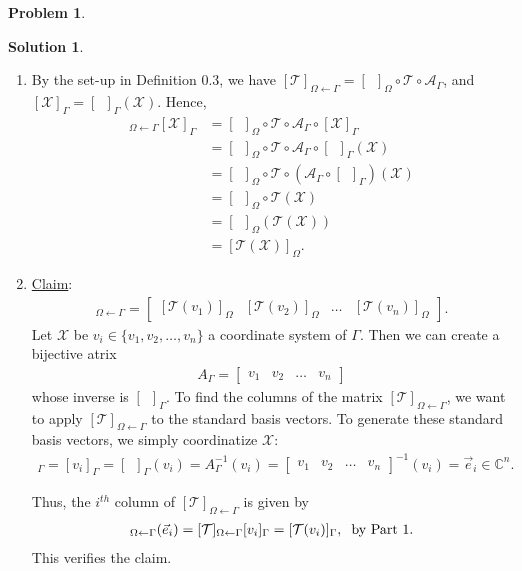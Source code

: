 \documentclass{book}
\theoremstyle{definition}
\newtheorem*{prob*}{Problem}
\newtheorem*{sln*}{Solution}
\newcommand{\T}{\mathcal{T}}
\begin{document}
\begin{prob*}
\begin{sln*}
\begin{enumerate}
			
			\item By the set-up in Definition 0.3, we have $[\T]_{\Omega\leftarrow \Gamma} = [\,\,\,]_\Omega\circ\T\circ \mathcal{A}_\Gamma$, and $[\mathcal{X}]_\Gamma = [\,\,\,]_\Gamma(\mathcal{X})$. Hence,
			\begin{align*}
			[\T]_{\Omega\leftarrow \Gamma}[\mathcal{X}]_\Gamma 
			&= [\,\,\,]_\Omega\circ\T\circ \mathcal{A}_\Gamma \circ [\mathcal{X}]_\Gamma \\
			&= [\,\,\,]_\Omega\circ\T\circ \mathcal{A}_\Gamma \circ [\,\,\,]_\Gamma(\mathcal{X})\\
			&= [\,\,\,]_\Omega\circ\T\circ \left(\mathcal{A}_\Gamma \circ [\,\,\,]_\Gamma\right)(\mathcal{X})\\
			&= [\,\,\,]_\Omega\circ\T(\mathcal{X})\\
			&= [\,\,\,]_\Omega\left(\T(\mathcal{X})\right)\\
			&= [\mathcal{T}(\mathcal{X})]_\Omega.
			\end{align*}
			
			
			
			
			\item \underline{Claim}:
			\begin{align*}
			[\T]_{\Omega\leftarrow\Gamma} = \begin{bmatrix}
			[\T(v_1)]_\Omega & [\T(v_2)]_\Omega & \dots & [\T(v_n)]_\Omega
			\end{bmatrix}.
			\end{align*}
			Let $\mathcal{X}$ be $v_i \in \{v_1,v_2,\dots,v_n\}$ a coordinate system of $\Gamma$. Then we can create a bijective atrix 
			\begin{align*}
			A_\Gamma = \begin{bmatrix}
			v_1 & v_2 & \dots & v_n
			\end{bmatrix}
			\end{align*}
			whose inverse is $[\,\,\,]_\Gamma$. To find the columns of the matrix $[\T]_{\Omega\leftarrow\Gamma}$, we want to apply $[\T]_{\Omega\leftarrow\Gamma}$ to the standard basis vectors. To generate these standard basis vectors, we simply coordinatize $\mathcal{X}$:
			\begin{align*}
			[\mathcal{X}]_\Gamma = [v_i]_\Gamma = [\,\,\,]_\Gamma(v_i)=A^{-1}_\Gamma(v_i) = \begin{bmatrix}
			v_1&v_2&\dots&v_n
			\end{bmatrix}^{-1}(v_i) =  \vec{e}_i \in \mathbb{C}^n.
			\end{align*} 
			 
			Thus, the $i^{th}$ column of $[\T]_{\Omega\leftarrow \Gamma}$ is given by 
			\begin{align*}
			[\T]_{\Omega\leftarrow \Gamma}(\vec{e}_i) = [\T]_{\Omega\leftarrow \Gamma}[v_i]_\Gamma = [\T(v_i)]_\Gamma, \hspace{0.2cm}\text{by Part 1}. 
			\end{align*}
			This verifies the claim.\\







\end{enumerate}
\end{sln*}
\end{prob*}
\end{document}
